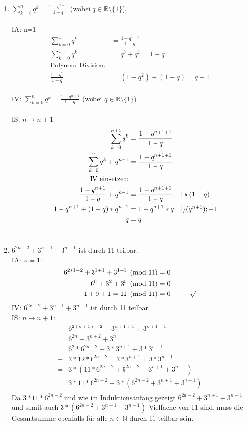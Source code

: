 \documentclass[12pt,letterpaper]{article}
\newcommand{\alignleft}[1]{\tag*{\llap{\makebox[\linewidth][l]{$#1$}}}}
\newcommand{\LLeftrightarrow}{ \alignleft{\Leftrightarrow}}
\newcommand{\eqinfo}[1]{&\makebox[2cm][l]{$\vert #1$}}
\newcommand{\Eqn}[3]{#1 &#2 #3}
\newcommand{\eqnf}[2]{\Eqn{#1}{=}{#2}\\}
\newcommand{\eqn}[2]{\LLeftrightarrow\Eqn{#1}{=}{#2}\\}
\newcommand{\eqni}[3]{\LLeftrightarrow\Eqn{#1}{=}{#2}\eqinfo{#3}\\}
\begin{document}
\begin{enumerate}
\begin{enumerate}
\item $\sum\limits_{k=0}^{n}q^k = \frac{1-q^{n+1}}{1-q}$ (wobei $q\in\mathbb{R}\setminus\{1\}$).\\ \\
IA: n=1
\begin{align*}
	\sum_{k=0}^{1}q^k &= \frac{1-q^{1+1}}{1-q}\\
	\sum_{k=0}^{1}q^k&=q^0+q^1=1+q\\
	\text{Polynom Division:}\\
	\frac{1-q^2}{1-q} &= (1-q^2)\div (1-q) = q+1
\end{align*}\\

IV: $\sum\limits_{k=0}^{n}q^k = \frac{1-q^{n+1}}{1-q}$ (wobei $q\in\mathbb{R}\setminus\{1\}$)\\
\\
IS: $n\to n+1$\\
\begin{align*}
	\eqnf{\sum_{k=0}^{n+1}q^k}{\frac{1-q^{n+1+1}}{1-q}}
	\eqn{\sum_{k=0}^{n}q^k+q^{n+1}}{\frac{1-q^{n+1+1}}{1-q}}
	\text{IV einsetzen:}\\
	\eqni{\frac{1-q^{n+1}}{1-q}+q^{n+1}}{\frac{1-q^{n+1+1}}{1-q}}{*(1-q)}
	\eqni{1-q^{n+1}+(1-q)*q^{n+1}}{1-q^{n+1}*q}{/(q^{n+1});-1}
	\eqn{q}{q}	
\end{align*}
\\
\item $6^{2n-2}+3^{n+1}+3^{n-1}$ ist durch 11 teilbar.\\
IA: $n=1$: 
\begin{align*}
\eqnf{6^{2*1-2}+3^{1+1}+3^{1-1} \pmod{11}}{0}
\eqn{6^0+3^2+3^0 \pmod{11}}{0}
\eqn{1+9+1 = 11 \pmod{11}}{0\makebox[1cm]{}\surd}
\end{align*}
IV: $6^{2n-2}+3^{n+1}+3^{n-1}$ ist durch 11 teilbar.\\
IS: $n\to n+1$:
\begin{align*}
&6^{2(n+1)-2}+3^{n+1+1}+3^{n+1-1}\\
= &6^{2n}+3^{n+2}+3^{n}\\
= &6^2*6^{2n-2}+3*3^{n+1}+3*3^{n-1}\\ 
= &3*12*6^{2n-2}+3*3^{n+1}+3*3^{n-1}\\
= &3*(11*6^{2n-2}+6^{2n-2}+3^{n+1}+3^{n-1})\\
= &3*11*6^{2n-2}+ 3*(6^{2n-2}+3^{n+1}+3^{n-1})\\
\end{align*}
Da $3*11*6^{2n-2}$ und wie im Induktionsanfang gezeigt $6^{2n-2}+3^{n+1}+3^{n-1}$ und somit auch $3*(6^{2n-2}+3^{n+1}+3^{n-1})$ Vielfache von 11 sind, muss die Gesamtsumme ebenfalls für alle $n\in\mathbb{N}$ durch 11 teilbar sein.

\end{enumerate}
\end{enumerate}
\end{document}
